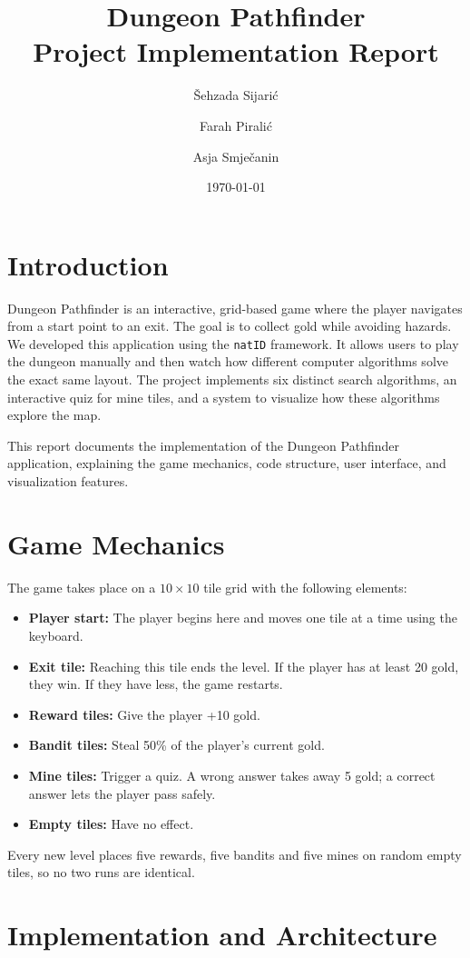 \documentclass[12pt, a4paper]{article}
\title{\textbf{Dungeon Pathfinder}\\ \large Project Implementation Report}
\author{Šehzada Sijarić \and Farah Piralić \and Asja Smječanin}
\date{\today}
\newcommand{\code}[1]{\texttt{#1}}
\begin{document}
\maketitle

\section{Introduction}
Dungeon Pathfinder is an interactive, grid-based game where the player navigates from a start point to an exit. The goal is to collect gold while avoiding hazards. We developed this application using the \code{natID} framework. It allows users to play the dungeon manually and then watch how different computer algorithms solve the exact same layout. The project implements six distinct search algorithms, an interactive quiz for mine tiles, and a system to visualize how these algorithms explore the map.

This report documents the implementation of the Dungeon Pathfinder application, explaining the game mechanics, code structure, user interface, and visualization features.

\section{Game Mechanics}
The game takes place on a $10 \times 10$ tile grid with the following elements:
\begin{itemize}
    \item \textbf{Player start:} The player begins here and moves one tile at a time using the keyboard.
    \item \textbf{Exit tile:} Reaching this tile ends the level. If the player has at least 20 gold, they win. If they have less, the game restarts.
    \item \textbf{Reward tiles:} Give the player +10 gold.
    \item \textbf{Bandit tiles:} Steal 50\% of the player's current gold.
    \item \textbf{Mine tiles:} Trigger a quiz. A wrong answer takes away 5 gold; a correct answer lets the player pass safely.
    \item \textbf{Empty tiles:} Have no effect.
\end{itemize}

Every new level places five rewards, five bandits and five mines on random empty tiles, so no two runs are identical.

\section{Implementation and Architecture}
\end{document}
